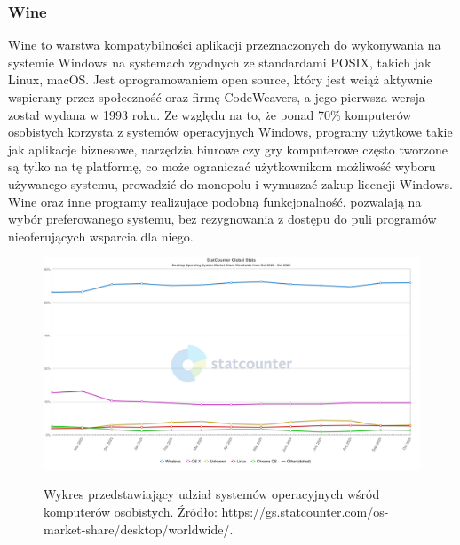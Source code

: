 \subsubsection{Wine\cite{wine}}
Wine to warstwa kompatybilności aplikacji przeznaczonych do wykonywania na systemie Windows na systemach zgodnych ze standardami POSIX, takich jak Linux, macOS. Jest oprogramowaniem open source, który jest wciąż aktywnie wspierany przez społeczność oraz firmę CodeWeavers, a jego pierwsza wersja został wydana w 1993 roku. Ze względu na to, że ponad 70\% komputerów osobistych korzysta z systemów operacyjnych Windows\cite{windowsMarketShare}, programy użytkowe takie jak aplikacje biznesowe, narzędzia biurowe czy gry komputerowe często tworzone są tylko na tę platformę, co może ograniczać użytkownikom możliwość wyboru używanego systemu, prowadzić do monopolu i wymuszać zakup licencji Windows. Wine oraz inne programy realizujące podobną funkcjonalność, pozwalają na wybór preferowanego systemu, bez rezygnowania z dostępu do puli programów nieoferujących wsparcia dla niego.

\begin{figure}[!h]
	\begin{center}
		\resizebox{1\textwidth}{!} {
			\includegraphics{img/3/desktop-os-market-share.png}
		}
		\caption{Wykres przedstawiający udział systemów operacyjnych wśród komputerów osobistych. Źródło: https://gs.statcounter.com/os-market-share/desktop/worldwide/.}
		\label{desktop-os-market-share}
	\end{center}
\end{figure}

